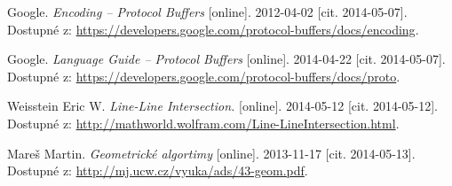 \begin{thebibliography}{99}
	{\sc Google.}
	\emph{Encoding -- Protocol Buffers} [online]. 
	2012-04-02 [cit. 2014-05-07]. \\
	Dostupné z: \url{https://developers.google.com/protocol-buffers/docs/encoding}.

	{\sc Google.}
	\emph{Language Guide -- Protocol Buffers} [online]. 
	2014-04-22 [cit. 2014-05-07]. \\
	Dostupné z:	\url{https://developers.google.com/protocol-buffers/docs/proto}.

	{\sc Weisstein} Eric W.
	\emph{Line-Line Intersection.} [online]. 
	2014-05-12 [cit. 2014-05-12]. \\
	Dostupné z:	\url{http://mathworld.wolfram.com/Line-LineIntersection.html}.

	{\sc Mareš} Martin.
	\emph{Geometrické algortimy} [online]. 
	2013-11-17 [cit. 2014-05-13]. \\
	Dostupné z:	\url{http://mj.ucw.cz/vyuka/ads/43-geom.pdf}.
	

\end{thebibliography}
